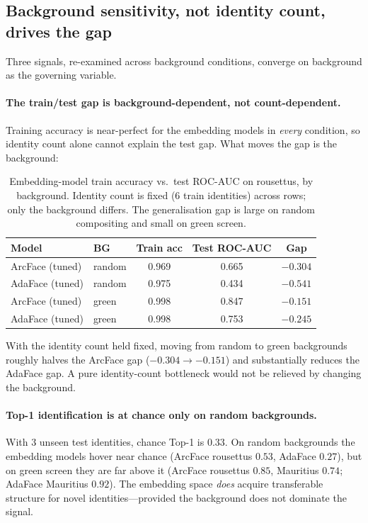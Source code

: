 \subsection{Background sensitivity, not identity count, drives the gap}
\label{sec:identity_wall}

Three signals, re-examined across background conditions, converge on background as the
governing variable.

\paragraph{The train/test gap is background-dependent, not count-dependent.}
Training accuracy is near-perfect for the embedding models in \emph{every} condition, so
identity count alone cannot explain the test gap.  What moves the gap is the background:

\begin{table}[h]
\centering
\caption{Embedding-model train accuracy vs.\ test ROC-AUC on rousettus, by background.
Identity count is fixed (6 train identities) across rows; only the background differs.
The generalisation gap is large on random compositing and small on green screen.}
\label{tab:overfit}
\setlength{\tabcolsep}{7pt}
\begin{tabular}{llccc}
\toprule
Model & BG & Train acc & Test ROC-AUC & Gap \\
\midrule
ArcFace (tuned) & random & 0.969 & 0.665 & $-0.304$ \\
AdaFace (tuned) & random & 0.975 & 0.434 & $-0.541$ \\
ArcFace (tuned) & green  & 0.998 & 0.847 & $-0.151$ \\
AdaFace (tuned) & green  & 0.998 & 0.753 & $-0.245$ \\
\bottomrule
\end{tabular}
\end{table}

With the identity count held fixed, moving from random to green backgrounds roughly
halves the ArcFace gap ($-0.304 \to -0.151$) and substantially reduces the AdaFace gap.
A pure identity-count bottleneck would not be relieved by changing the background.

\paragraph{Top-1 identification is at chance only on random backgrounds.}
With 3 unseen test identities, chance Top-1 is $0.33$.  On random backgrounds the
embedding models hover near chance (ArcFace rousettus $0.53$, AdaFace $0.27$), but on
green screen they are far above it (ArcFace rousettus $0.85$, Mauritius $0.74$; AdaFace
Mauritius $0.92$).  The embedding space \emph{does} acquire transferable structure for
novel identities---provided the background does not dominate the signal.

